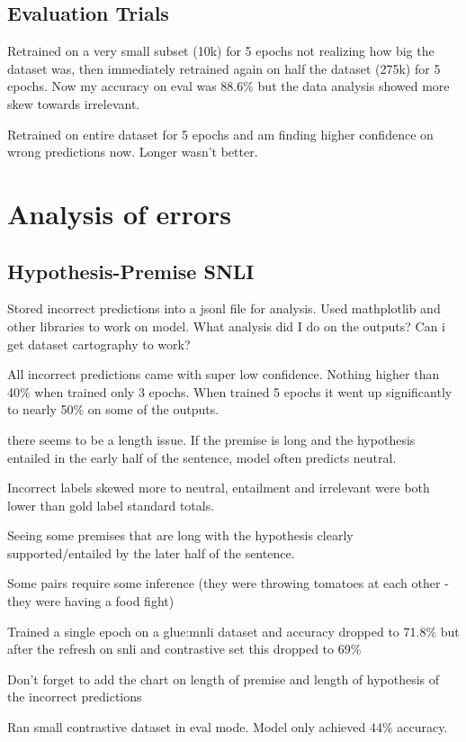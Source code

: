 \documentclass[11pt]{article}
\begin{document}
\subsection{Evaluation Trials}
Retrained on a very small subset (10k) for 5 epochs not realizing how big the dataset was, then immediately retrained again on half the dataset (275k) for 5 epochs. Now my accuracy on eval was 88.6\% but the data analysis showed more skew towards irrelevant.

Retrained on entire dataset for 5 epochs and am finding higher confidence on wrong predictions now. Longer wasn't better.

\section{Analysis of errors}
\subsection{Hypothesis-Premise SNLI}

Stored incorrect predictions into a jsonl file for analysis. Used mathplotlib and other libraries to work on model.
What analysis did I do on the outputs? Can i get dataset cartography to work?

All incorrect predictions came with super low confidence. Nothing higher than 40\% when trained only 3 epochs. When trained 5 epochs it went up significantly to nearly 50\% on some of the outputs.

there seems to be a length issue. If the premise is long and the hypothesis entailed in the early half of the sentence, model often predicts neutral.

Incorrect labels skewed more to neutral, entailment and irrelevant were both lower than gold label standard totals.

Seeing some premises that are long with the hypothesis clearly supported/entailed by the later half of the sentence. 

Some pairs require some inference (they were throwing tomatoes at each other - they were having a food fight)

Trained a single epoch on a glue:mnli dataset and accuracy dropped to 71.8\%  but after the refresh on snli and contrastive set this dropped to 69\%

Don't forget to add the chart on length of premise and length of hypothesis of the incorrect predictions

Ran small contrastive dataset in eval mode. Model only achieved 44\% accuracy.
\end{document}

